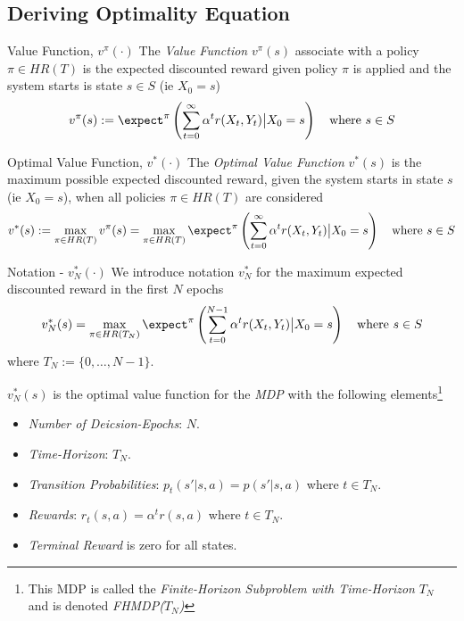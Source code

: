 \documentclass[11pt,a4paper]{article}
\begin{document}
\subsection*{Deriving Optimality Equation}

  \begin{definition}{Value Function, $v^\pi(\cdot)$}
    The \textit{Value Function} $v^\pi(s)$ associate with a policy $\pi\in HR(T)$ is the expected discounted reward given policy $\pi$ is applied and the system starts is state $s\in S$ (ie $X_0=s$)
    \[ v^\pi(s):=\expect^\pi\left(\sum_{t=0}^\infty\alpha^tr(X_t,Y_t)\big|X_0=s\right)\quad\text{where }s\in S \]
  \end{definition}

  \begin{definition}{Optimal Value Function, $v^*(\cdot)$}
    The \textit{Optimal Value Function} $v^*(s)$ is the maximum possible expected discounted reward, given the system starts in state $s$ (ie $X_0=s$), when all policies $\pi\in HR(T)$ are considered
    \[ v^*(s):=\max_{\pi\in HR(T)}v^\pi(s)=\max_{\pi\in HR(T)}\expect^\pi\left(\sum_{t=0}^\infty\alpha^tr(X_t,Y_t)\big|X_0=s\right)\quad\text{where }s\in S \]
  \end{definition}

  \begin{remark}{Notation - $v_N^*(\cdot)$}
    We introduce notation $v_N^*$ for the maximum expected discounted reward in the first $N$ epochs
    \[ v_N^*(s)=\max_{\pi\in HR(T_N)}\expect^\pi\left(\sum_{t=0}^{N-1}\alpha^tr(X_t,Y_t)\big|X_0=s\right)\quad\text{where }s\in S \]
    where $T_N:=\{0,\dots,N-1\}$.
    \par $v_N^*(s)$ is the optimal value function for the \textit{MDP} with the following elements\footnote{This MDP is called the \textit{Finite-Horizon Subproblem with Time-Horizon} $T_N$ and is denoted \textit{FHMDP($T_N$)}}
    \begin{itemize}
      \item \textit{Number of Deicsion-Epochs}: $N$.
      \item \textit{Time-Horizon}: $T_N$.
      \item \textit{Transition Probabilities}: $p_t(s'|s,a)=p(s'|s,a)$ where $t\in T_N$.
      \item \textit{Rewards}: $r_t(s,a)=\alpha^tr(s,a)$ where $t\in T_N$.
      \item \textit{Terminal Reward} is zero for all states.
    \end{itemize}
  \end{remark}
\end{document}
